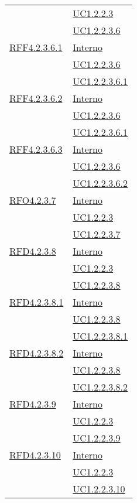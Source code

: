 \begin{longtable}{|>{\centering}m{5cm}|m{5cm}<{\centering}|}
& \hyperref[UC1.2.2.3]{UC1.2.2.3}\\
& \hyperref[UC1.2.2.3.6]{UC1.2.2.3.6}\\ \hline
\hyperlink{RFF4.2.3.6.1}{RFF4.2.3.6.1} & \hyperlink{Interno}{Interno}\\
& \hyperref[UC1.2.2.3.6]{UC1.2.2.3.6}\\
& \hyperref[UC1.2.2.3.6.1]{UC1.2.2.3.6.1}\\ \hline
\hyperlink{RFF4.2.3.6.2}{RFF4.2.3.6.2} & \hyperlink{Interno}{Interno}\\
& \hyperref[UC1.2.2.3.6]{UC1.2.2.3.6}\\
& \hyperref[UC1.2.2.3.6.1]{UC1.2.2.3.6.1}\\ \hline
\hyperlink{RFF4.2.3.6.3}{RFF4.2.3.6.3} & \hyperlink{Interno}{Interno}\\
& \hyperref[UC1.2.2.3.6]{UC1.2.2.3.6}\\
& \hyperref[UC1.2.2.3.6.2]{UC1.2.2.3.6.2}\\ \hline
\hyperlink{RFO4.2.3.7}{RFO4.2.3.7} & \hyperlink{Interno}{Interno}\\
& \hyperref[UC1.2.2.3]{UC1.2.2.3}\\
& \hyperref[UC1.2.2.3.7]{UC1.2.2.3.7}\\ \hline
\hyperlink{RFD4.2.3.8}{RFD4.2.3.8} & \hyperlink{Interno}{Interno}\\
& \hyperref[UC1.2.2.3]{UC1.2.2.3}\\
& \hyperref[UC1.2.2.3.8]{UC1.2.2.3.8}\\ \hline
\hyperlink{RFD4.2.3.8.1}{RFD4.2.3.8.1} & \hyperlink{Interno}{Interno}\\
& \hyperref[UC1.2.2.3.8]{UC1.2.2.3.8}\\
& \hyperref[UC1.2.2.3.8.1]{UC1.2.2.3.8.1}\\ \hline
\hyperlink{RFD4.2.3.8.2}{RFD4.2.3.8.2} & \hyperlink{Interno}{Interno}\\
& \hyperref[UC1.2.2.3.8]{UC1.2.2.3.8}\\
& \hyperref[UC1.2.2.3.8.2]{UC1.2.2.3.8.2}\\ \hline
\hyperlink{RFD4.2.3.9}{RFD4.2.3.9} & \hyperlink{Interno}{Interno}\\
& \hyperref[UC1.2.2.3]{UC1.2.2.3}\\
& \hyperref[UC1.2.2.3.9]{UC1.2.2.3.9}\\ \hline
\hyperlink{RFD4.2.3.10}{RFD4.2.3.10} & \hyperlink{Interno}{Interno}\\
& \hyperref[UC1.2.2.3]{UC1.2.2.3}\\
& \hyperref[UC1.2.2.3.10]{UC1.2.2.3.10}\\ \hline

\end{longtable}
